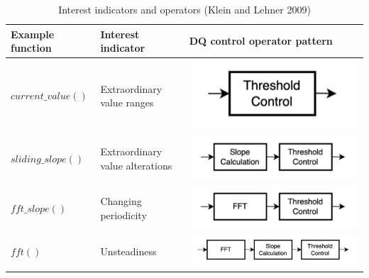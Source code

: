 \begin{table}[H]
    \centering
    \scriptsize %
    \begin{tabular}{|M{2cm}|M{2cm}|M{8cm}|}
        \hline
        \textbf{Example function}   & \textbf{Interest indicator}     & \textbf{DQ control operator pattern}                                              \\ \hline
        \textbf{$current\_value()$} & Extraordinary value ranges      & \includegraphics[scale=0.75]{figures/literature_review/interest_indicators_1.png} \\ \hline
        \textbf{$sliding\_slope()$} & Extraordinary value alterations & \includegraphics[scale=0.75]{figures/literature_review/interest_indicators_2.png} \\ \hline
        \textbf{$fft\_slope()$}     & Changing periodicity            & \includegraphics[scale=0.75]{figures/literature_review/interest_indicators_3.png} \\ \hline
        \textbf{$fft()$}            & Unsteadiness                    & \includegraphics[scale=0.75]{figures/literature_review/interest_indicators_4.png} \\ \hline
    \end{tabular}
    \caption{Interest indicators and operators (Klein and Lehner 2009)}
    \label{table:interest_indicators}
\end{table}